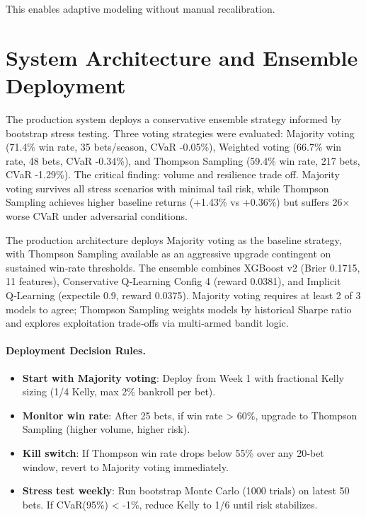 This enables adaptive modeling without manual recalibration.

\section{System Architecture and Ensemble Deployment}
\label{sec:system_architecture}

The production system deploys a conservative ensemble strategy informed by bootstrap stress testing. Three voting strategies were evaluated: Majority voting (71.4\% win rate, 35 bets/season, CVaR -0.05\%), Weighted voting (66.7\% win rate, 48 bets, CVaR -0.34\%), and Thompson Sampling (59.4\% win rate, 217 bets, CVaR -1.29\%). The critical finding: volume and resilience trade off. Majority voting survives all stress scenarios with minimal tail risk, while Thompson Sampling achieves higher baseline returns (+1.43\% vs +0.36\%) but suffers 26× worse CVaR under adversarial conditions.

The production architecture deploys Majority voting as the baseline strategy, with Thompson Sampling available as an aggressive upgrade contingent on sustained win‑rate thresholds. The ensemble combines XGBoost v2 (Brier 0.1715, 11 features), Conservative Q‑Learning Config 4 (reward 0.0381), and Implicit Q‑Learning (expectile 0.9, reward 0.0375). Majority voting requires at least 2 of 3 models to agree; Thompson Sampling weights models by historical Sharpe ratio and explores exploitation trade‑offs via multi‑armed bandit logic.

\paragraph{Deployment Decision Rules.}
\begin{itemize}
\item \textbf{Start with Majority voting}: Deploy from Week 1 with fractional Kelly sizing (1/4 Kelly, max 2\% bankroll per bet).
\item \textbf{Monitor win rate}: After 25 bets, if win rate > 60\%, upgrade to Thompson Sampling (higher volume, higher risk).
\item \textbf{Kill switch}: If Thompson win rate drops below 55\% over any 20‑bet window, revert to Majority voting immediately.
\item \textbf{Stress test weekly}: Run bootstrap Monte Carlo (1000 trials) on latest 50 bets. If CVaR(95\%) < -1\%, reduce Kelly to 1/6 until risk stabilizes.
\end{itemize}

